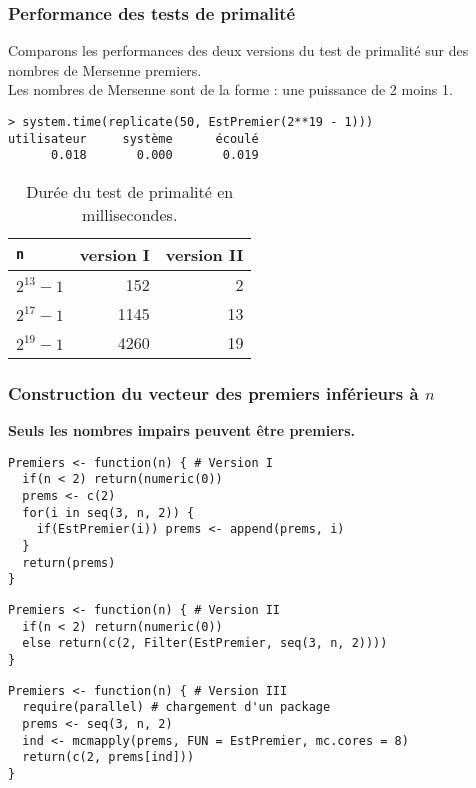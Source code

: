 \documentclass[10pt]{beamer}
\begin{document}
\begin{frame}[fragile]
  \frametitle{Performance des tests de primalité }

  Comparons les performances des deux versions du test de primalité  sur des nombres de Mersenne premiers. \\
  Les nombres de Mersenne sont de la forme : une puissance de 2 moins 1.

  \begin{lstlisting}
> system.time(replicate(50, EstPremier(2**19 - 1)))
utilisateur     système      écoulé 
      0.018       0.000       0.019     
  \end{lstlisting}

  \begin{table}[ht]
    \centering
    \begin{tabular}{l|rr}
      \toprule
      \texttt{n} & version I & version II \\
      \midrule
      $2^{13}-1$ & 152       & 2          \\
      $2^{17}-1$ & 1145      & 13         \\
      $2^{19}-1$ & 4260      & 19         \\
      \bottomrule
    \end{tabular}
    \caption{Durée du test de primalité en millisecondes.}
  \end{table}

\end{frame}


\begin{frame}[fragile]
  \frametitle{Construction du vecteur des premiers inférieurs à $n$ }

  \textbf{Seuls les nombres impairs peuvent être premiers.}

\begin{lstlisting}[style=editor]
Premiers <- function(n) { # Version I
  if(n < 2) return(numeric(0))
  prems <- c(2)
  for(i in seq(3, n, 2)) {
    if(EstPremier(i)) prems <- append(prems, i)
  }
  return(prems)
}    
\end{lstlisting}


\begin{lstlisting}[style=editor]
Premiers <- function(n) { # Version II
  if(n < 2) return(numeric(0))
  else return(c(2, Filter(EstPremier, seq(3, n, 2))))
}    
\end{lstlisting}


\begin{lstlisting}[style=editor]
Premiers <- function(n) { # Version III
  require(parallel) # chargement d'un package
  prems <- seq(3, n, 2)
  ind <- mcmapply(prems, FUN = EstPremier, mc.cores = 8)
  return(c(2, prems[ind]))
}  
\end{lstlisting}

\end{frame}
\end{document}
